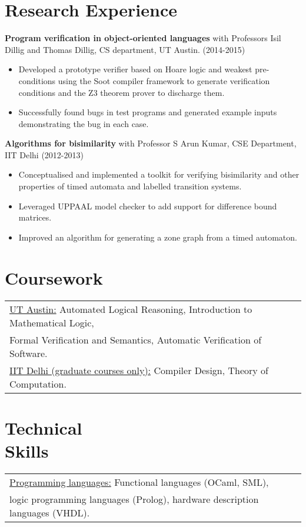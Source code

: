 \documentclass[margin]{res}
\begin{document}
\begin{resume}
\section{Research Experience}
 
 {\bf Program verification in object-oriented languages} with Professors Isil Dillig and Thomas
 Dillig, CS department, UT Austin. \hfill (2014-2015)
 \begin{itemize} \itemsep -2pt  %
 \item Developed a prototype verifier based on Hoare logic and weakest
   pre-conditions using the Soot compiler framework to generate
   verification conditions and the Z3 theorem prover to discharge them.
 \item Successfully found bugs in test programs and generated example
   inputs demonstrating the bug in each case.
 \end{itemize}

        {\bf Algorithms for bisimilarity} with Professor S
        Arun Kumar, CSE Department, IIT Delhi    \hfill
        (2012-2013) 
        \begin{itemize} \itemsep -2pt
        \item Conceptualised and implemented a toolkit for
          verifying bisimilarity and other properties of timed automata
          and labelled transition systems.
        \item Leveraged UPPAAL model checker to add support
          for difference bound matrices.
        \item Improved an algorithm for generating a zone
          graph from a timed automaton.

	\end{itemize}

\section{Coursework}
\begin{tabular}{l p{3in}}
  \underline{UT Austin:} Automated Logical Reasoning, Introduction to
  Mathematical Logic, \\ Formal Verification and Semantics, Automatic
  Verification of Software. \\
  \underline{IIT Delhi (graduate courses only):} Compiler Design,
  Theory of Computation.
\end{tabular}

\section{Technical \\ Skills}
   \begin{tabular}{l p{3in}}
    \underline{Programming languages:} Functional languages (OCaml,
    SML), \\ logic programming languages (Prolog),
    hardware description languages (VHDL). \\


\end{tabular}
\end{resume}
\end{document}
